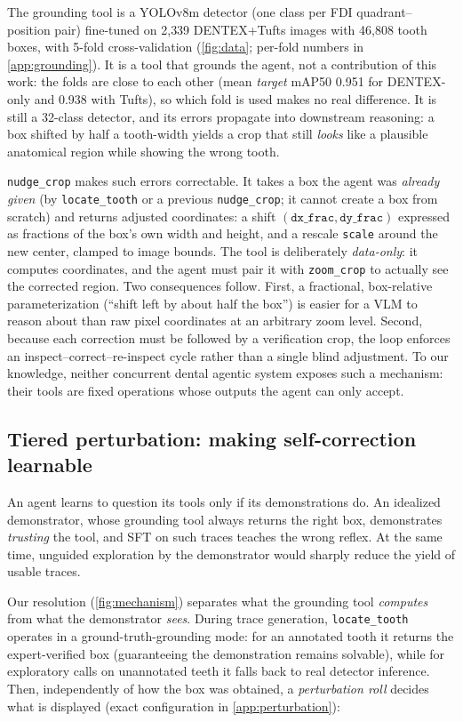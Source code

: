 The grounding tool is a YOLOv8m detector \citep{jocher2023yolov8} (one class per FDI quadrant--position pair) fine-tuned on
2{,}339 DENTEX+Tufts images with 46{,}808 tooth boxes, with 5-fold cross-validation (\cref{fig:data}; per-fold numbers in
\cref{app:grounding}). It is a tool that grounds the agent, not a contribution of this work: the folds are close to each
other (mean \emph{target} mAP50 0.951 for DENTEX-only and 0.938 with Tufts), so which fold is used makes no real
difference. It is still a 32-class detector, and its errors propagate into downstream reasoning: a box shifted by half
a tooth-width yields a crop that still \emph{looks} like a plausible anatomical region while showing the wrong tooth.

\texttt{nudge\_crop} makes such errors correctable. It takes a box the agent was
\emph{already given} (by \texttt{locate\_tooth} or a previous \texttt{nudge\_crop}; it cannot
create a box from scratch) and returns adjusted coordinates: a shift $(\texttt{dx\_frac},
\texttt{dy\_frac})$ expressed as fractions of the box's own width and height, and a rescale
\texttt{scale} around the new center, clamped to image bounds. The tool is deliberately
\emph{data-only}: it computes coordinates, and the agent must pair it with \texttt{zoom\_crop}
to actually see the corrected region. Two consequences follow. First, a fractional,
box-relative parameterization (``shift left by about half the box'') is easier for a VLM to
reason about than raw pixel coordinates at an arbitrary zoom level. Second, because
each correction must be followed by a verification crop, the loop enforces an
inspect--correct--re-inspect cycle rather than a single blind adjustment. To our knowledge, neither
concurrent dental agentic system exposes such a mechanism: their tools are fixed operations
whose outputs the agent can only accept.

\subsection{Tiered perturbation: making self-correction learnable}
\label{sec:perturbation}

An agent learns to question its tools only if its demonstrations do. An idealized
demonstrator, whose grounding tool always returns the right box, demonstrates
\emph{trusting} the tool, and SFT on such traces teaches the wrong reflex. At the same time, unguided exploration by the demonstrator would sharply reduce the yield of
usable traces.

Our resolution (\cref{fig:mechanism}) separates what the grounding tool \emph{computes} from
what the demonstrator \emph{sees}. During trace generation, \texttt{locate\_tooth} operates in a
ground-truth-grounding mode: for an annotated tooth it returns the expert-verified box
(guaranteeing the demonstration remains solvable), while for exploratory calls on unannotated
teeth it falls back to real detector inference. Then, independently of how the box was obtained,
a \emph{perturbation roll} decides what is displayed (exact configuration in
\cref{app:perturbation}):

